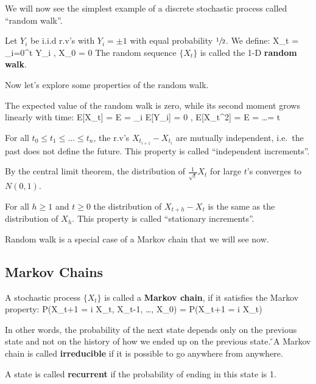 We will now see the simplest example of a discrete stochastic process called ``random walk''.

Let $Y_{i}$ be i.i.d r.v's with $Y_{i} = \pm 1$ with equal probability $\sfrac{1}{2}$. We define:
\bse
X_{t} = \sum_{i=0}^{t} Y_{i} \: , \qquad X_{0} = 0
\ese
The random sequence $\{ X_{t} \}$ is called the 1-D \textbf{random walk}.
\ed


Now let's explore some properties of the random walk.
\ben
\item The expected value of the random walk is zero, while its second moment grows linearly with time:
\bse
E[X_{t}] = E  = \sum_{i} E[Y_{i}] = 0 \: , \qquad
E[X_{t}^2] = E  = \ldots = t
\ese
\item For all $t_{0} \leq t_{1} \leq \ldots \leq t_{n}$, the r.v's $X_{t_{i+1}} - X_{t_{i}}$ are mutually
independent, i.e.\ the past does not define the future. This property is called ``independent increments''.
\item By the central limit theorem, the distribution of $\frac{1}{\sqrt{t}} X_{t}$ for large $t$'s converges to
$N(0,1)$.
\item For all $h \geq 1$ and $t \geq 0$ the distribution of $X_{t+h} - X_{t}$ is the same as the distribution of
$X_{h}$. This property is called ``stationary increments''.
\een

Random walk is a special case of a Markov chain that we will see now.

\subsection{Markov Chains}

A stochastic process $\{ X_{t} \}$ is called a \textbf{Markov chain}, if it satisfies the Markov property:
\bse
P(X_{t+1} = i \mid X_{t}, X_{t-1}, \ldots, X_{0}) = P(X_{t+1} = i \mid X_{t})
\ese
\ed

In other words, the probability of the next state depends only on the previous state and not on the history of how
we ended up on the previous state. \v

A Markov chain is called \textbf{irreducible} if it is possible to go anywhere from anywhere.
\ed

A state is called \textbf{recurrent} if the probability of ending in this state is 1.
\ed


